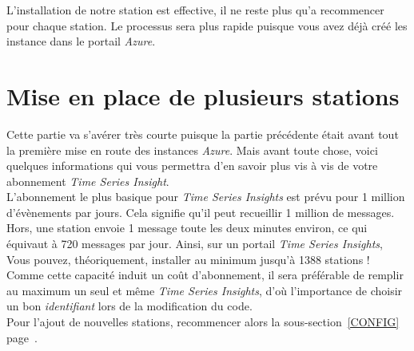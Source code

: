 L'installation de notre station est effective, il ne reste plus qu'a recommencer pour chaque station. Le processus sera plus rapide puisque vous avez déjà créé les instance dans le portail \textit{Azure}.


\section{Mise en place de plusieurs stations}

Cette partie va s'avérer très courte puisque la partie précédente était avant tout la première mise en route des instances \textit{Azure}. Mais avant toute chose, voici quelques informations qui vous permettra d'en savoir plus vis à vis de votre abonnement \textit{Time Series Insight}.\\

L'abonnement le plus basique pour \textit{Time Series Insights} est prévu pour 1 million d'évènements par jours. Cela signifie qu'il peut recueillir 1 million de messages. Hors, une station envoie 1 message toute les deux minutes environ, ce qui équivaut à 720 messages par jour. Ainsi, sur un portail \textit{Time Series Insights}, Vous pouvez, théoriquement, installer au minimum jusqu'à 1388 stations !\\

Comme cette capacité induit un coût d'abonnement, il sera préférable de remplir au maximum un seul et même \textit{Time Series Insights}, d'où l'importance de choisir un bon \textit{identifiant} lors de la modification du code.\\

Pour l'ajout de nouvelles stations, recommencer alors la sous-section~\ref{CONFIG} page~\pageref{CONFIG}.












	
	




